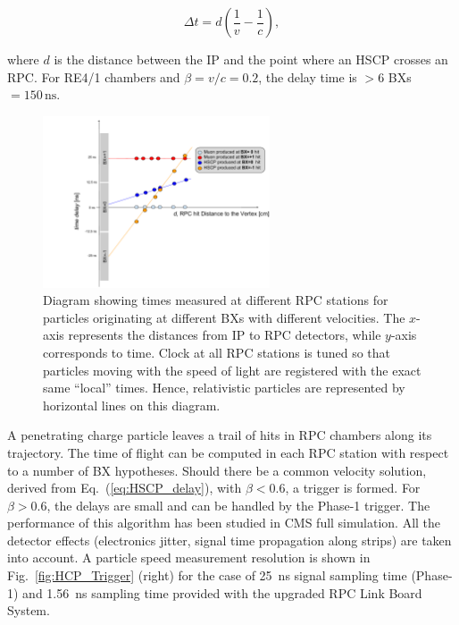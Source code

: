 \begin{equation}
\label{eq:HSCP_delay}
\Delta t = d\left(\frac{1}{v}-\frac{1}{c}\right),
\end{equation}

where $d$ is the distance between the IP and the point where an HSCP crosses an RPC. 
For RE4/1 chambers and $\beta = v/c = 0.2$, the delay time is $>6$ BXs $= 150 \, \mathrm{ns}$.

\begin{figure}[h!tbp]
  \centering
  \includegraphics[width=0.6\textwidth]{figures/HSCP/diagram.pdf}
  \caption{
Diagram showing times measured at different RPC stations for particles originating at different BXs with different velocities. The $x$-axis represents the distances from IP to RPC detectors, while $y$-axis corresponds to time.
Clock at all RPC stations is tuned so that particles moving with the speed of light are registered with the exact same ``local'' times. Hence, relativistic particles are represented by horizontal lines on this diagram. 
  }
  \label{fig:HSCP_diagram}
\end{figure}


A penetrating charge particle leaves a trail of hits in RPC chambers along its trajectory.
The time of flight can be computed in each RPC station with respect to a number of BX hypotheses.
Should there be a common velocity solution, derived from Eq.~(\ref{eq:HSCP_delay}), 
with $\beta < 0.6$, a trigger is formed.
For $\beta >0.6$, the delays are small and can be handled by the Phase-1 trigger.  
The performance of this algorithm has been studied in CMS full simulation. All the detector effects 
(electronics jitter, signal time propagation along strips) are taken into account. 
A particle speed measurement resolution is shown in Fig.~\ref{fig:HCP_Trigger} (right) for the case of 25~ns
signal sampling time (Phase-1) and 1.56~ns sampling time provided with the upgraded RPC Link Board System.

